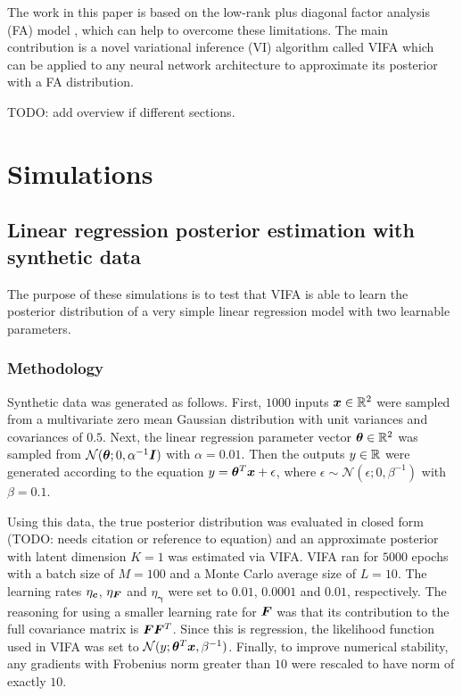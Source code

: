 \documentclass[10pt]{article} %
\newcommand{\vgamma}{\bm{\gamma}}
\begin{document}
The work in this paper is based on the low-rank plus diagonal factor analysis (FA) model \citep{barber2007}, which can help to overcome these limitations. The main contribution is a novel variational inference (VI) algorithm called VIFA which can be applied to any neural network architecture to approximate its posterior with a FA distribution. 

TODO: add overview if different sections.

\section{Simulations}

\subsection{Linear regression posterior estimation with synthetic data}

The purpose of these simulations is to test that VIFA is able to learn the posterior distribution of a very simple linear regression model with two learnable parameters.

\subsubsection{Methodology}\label{sec:linear_regression_synthetic_data_posterior_methodology}

Synthetic data was generated as follows. First, $1000$ inputs ${\bm{x}} \in \mathbb{R}^2$ were sampled from a multivariate zero mean Gaussian distribution with unit variances and covariances of $0.5$. Next, the linear regression parameter vector ${\bm{\theta}} \in \mathbb{R}^2$ was sampled from $\mathcal{N} ( {\bm{\theta}} ; 0, \alpha^{-1} {\bm{I}})$ with $\alpha = 0.01$. Then the outputs $y \in \mathbb{R}$ were generated according to the equation $y = {\bm{\theta}}^T {\bm{x}} + \epsilon$, where $\epsilon \sim \mathcal{N} ( \epsilon ; 0, \beta^{-1})$ with $\beta = 0.1$.

Using this data, the true posterior distribution was evaluated in closed form (TODO: needs citation or reference to equation) and an approximate posterior with latent dimension $K=1$ was estimated via VIFA. VIFA ran for $5000$ epochs with a batch size of $M=100$ and a Monte Carlo average size of $L=10$.  The learning rates $\eta_{\bm{c}}$,  $\eta_{\bm{F}}$ and $\eta_{\vgamma}$ were set to $0.01$, $0.0001$ and $0.01$, respectively. The reasoning for using a smaller learning rate for ${\bm{F}}$ was that its contribution to the full covariance matrix is ${\bm{F}}{\bm{F}}^T$. Since this is regression, the likelihood function used in VIFA was set to $\mathcal{N} (y; {\bm{\theta}}^T {\bm{x}}, \beta^{-1})$. Finally, to improve numerical stability, any gradients with Frobenius norm greater than $10$ were rescaled to have norm of exactly $10$.
\end{document}
